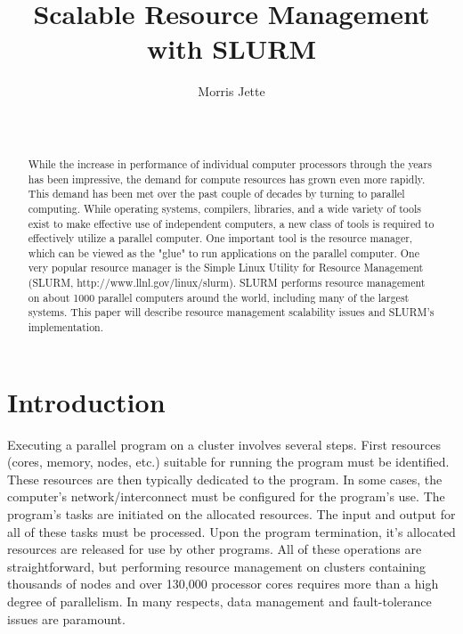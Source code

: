 \documentclass{../common/acm}
\def\ctit{Scalable Resource Management with SLURM}
\def\ucrl{UCRL-JC-TBD}
\def\auth{Morris Jette}
\def\pubdate{January 23, 2006}
\def\journal{Operating Systems Reviews}
\begin{document}

\title{\ctit}
\author{
\alignauthor Morris Jette\\
	\\
	\\
}

\maketitle
\begin{abstract}
While the increase in performance of individual computer 
processors through the years has been impressive, the demand
for compute resources has grown even more rapidly. 
This demand has been met over the past couple of decades by 
turning to parallel computing. 
While operating systems, compilers, libraries, and a wide 
variety of tools exist to make effective use of independent 
computers, a new class of tools is required to effectively 
utilize a parallel computer. 
One important tool is the resource manager, which can be viewed 
as the "glue" to run applications on the parallel computer. 
One very popular resource manager is the Simple Linux
Utility for Resource Management (SLURM, 
http://www.llnl.gov/linux/slurm). 
SLURM performs resource management on about 1000 parallel 
computers around the world, including many of the largest 
systems. 
This paper will describe resource management scalability 
issues and SLURM's implementation.
\end{abstract}


\section{Introduction}

Executing a parallel program on a cluster involves several 
steps. First resources (cores, memory, nodes, etc.) suitable 
for running the program must be identified. These resources 
are then typically dedicated to the program. In some 
cases, the computer's network/interconnect must be 
configured for the program's use. The program's tasks
are initiated on the allocated resources. The input and 
output for all of these tasks must be processed. 
Upon the program termination, it's allocated resources 
are released for use by other programs. 
All of these operations are straightforward, but performing 
resource management on clusters containing thousands of 
nodes and over 130,000 processor cores requires more 
than a high degree of parallelism.
In many respects, data management and fault-tolerance issues
are paramount.
\end{document}
